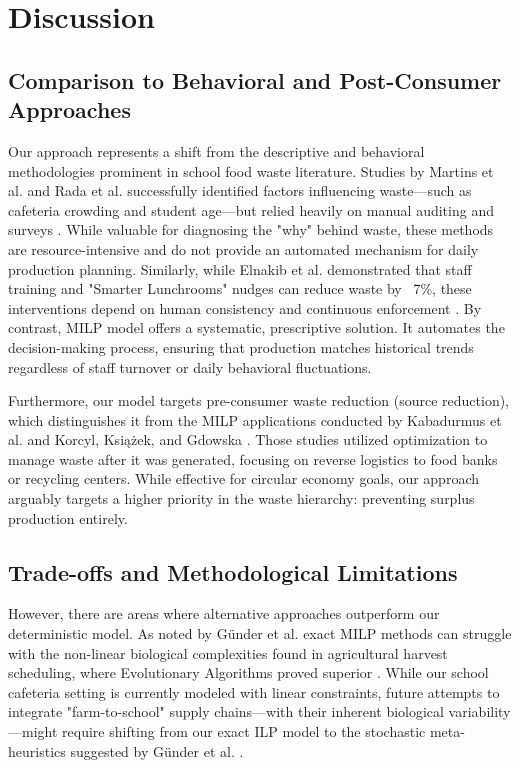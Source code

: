 \documentclass{scrartcl}
\begin{document}

\section{Discussion}

\subsection{Comparison to Behavioral and Post-Consumer Approaches}

Our approach represents a shift from the descriptive and behavioral methodologies prominent in school food waste literature. Studies by Martins et al. and Rada et al. successfully identified factors influencing waste—such as cafeteria crowding and student age—but relied heavily on manual auditing and surveys \cite{factors, rada}. While valuable for diagnosing the "why" behind waste, these methods are resource-intensive and do not provide an automated mechanism for daily production planning. Similarly, while Elnakib et al. demonstrated that staff training and "Smarter Lunchrooms" nudges can reduce waste by ~7\%, these interventions depend on human consistency and continuous enforcement \cite{elnakib}. By contrast, MILP model offers a systematic, prescriptive solution. It automates the decision-making process, ensuring that production matches historical trends regardless of staff turnover or daily behavioral fluctuations.

Furthermore, our model targets pre-consumer waste reduction (source reduction), which distinguishes it from the MILP applications conducted by Kabadurmus et al. and Korcyl, Ksi{\k{a}}{\.z}ek, and Gdowska \cite{kabadurmus, korcyl}. Those studies utilized optimization to manage waste after it was generated, focusing on reverse logistics to food banks or recycling centers. While effective for circular economy goals, our approach arguably targets a higher priority in the waste hierarchy: preventing surplus production entirely.

\subsection{Trade-offs and Methodological Limitations}

However, there are areas where alternative approaches outperform our deterministic model. As noted by G{\"u}nder et al. exact MILP methods can struggle with the non-linear biological complexities found in agricultural harvest scheduling, where Evolutionary Algorithms proved superior \cite{gunder}. While our school cafeteria setting is currently modeled with linear constraints, future attempts to integrate "farm-to-school" supply chains—with their inherent biological variability—might require shifting from our exact ILP model to the stochastic meta-heuristics suggested by G{\"u}nder et al. \cite{gunder}.
\end{document}
